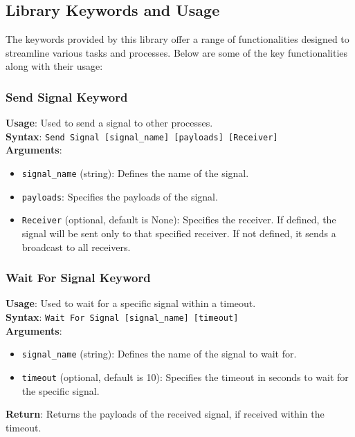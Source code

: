\subsection{Library Keywords and Usage}
\label{subsec:keyword-usage}

The keywords provided by this library offer a range of functionalities designed to streamline various tasks and processes. Below are some of the key functionalities along with their usage:

\subsubsection{Send Signal Keyword}
\textbf{Usage}: Used to send a signal to other processes. \\
\textbf{Syntax}: \texttt{Send Signal [signal\_name] [payloads] [Receiver]} \\
\textbf{Arguments}:
\begin{itemize}
    \item \texttt{signal\_name} (string): Defines the name of the signal.
    \item \texttt{payloads}: Specifies the payloads of the signal.
    \item \texttt{Receiver} (optional, default is None): Specifies the receiver. If defined, the signal will be sent only to that specified receiver. If not defined, it sends a broadcast to all receivers.
\end{itemize}

\subsubsection{Wait For Signal Keyword}
\textbf{Usage}: Used to wait for a specific signal within a timeout. \\
\textbf{Syntax}: \texttt{Wait For Signal [signal\_name] [timeout]} \\
\textbf{Arguments}:
\begin{itemize}
    \item \texttt{signal\_name} (string): Defines the name of the signal to wait for.
    \item \texttt{timeout} (optional, default is 10): Specifies the timeout in seconds to wait for the specific signal.
\end{itemize}
\textbf{Return}: Returns the payloads of the received signal, if received within the timeout.

